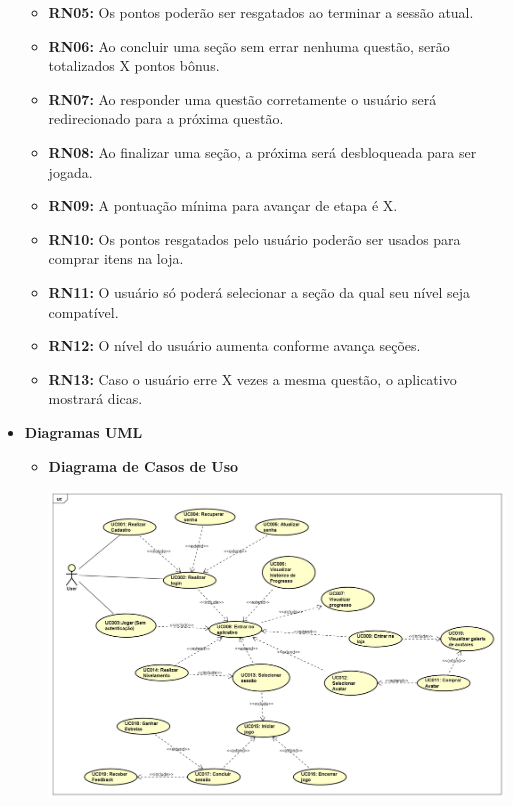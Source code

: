 \begin{itemize}
\begin{itemize}
        \item \textbf{RN05:} Os pontos poderão ser resgatados ao terminar a sessão atual.

        \item \textbf{RN06:} Ao concluir uma seção sem errar nenhuma questão, serão totalizados X pontos bônus.

        \item \textbf{RN07:} Ao responder uma questão corretamente o usuário será redirecionado para a próxima questão.

        \item \textbf{RN08:} Ao finalizar uma seção, a próxima será desbloqueada para ser jogada.

        \item \textbf{RN09:} A pontuação mínima para avançar de etapa é X.

        \item \textbf{RN10:} Os pontos resgatados pelo usuário poderão ser usados para comprar itens na loja.

        \item \textbf{RN11:} O usuário só poderá selecionar a seção da qual seu nível seja compatível.

        \item \textbf{RN12:} O nível do usuário aumenta conforme avança seções.

        \item \textbf{RN13:} Caso o usuário erre X vezes a mesma questão, o aplicativo mostrará dicas.
        
    
    \end{itemize}

    \item \textbf{Diagramas UML}
    \begin{itemize}
        \item \textbf{Diagrama de Casos de Uso}
        \begin{center}
    \includegraphics[width=\linewidth]{figuras/UseCase_TCC-1.png}


\end{center}
\end{itemize}
\end{itemize}
